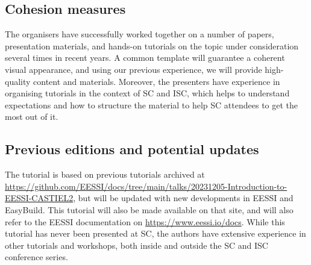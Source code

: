 \subsection*{Cohesion measures}
The organisers have successfully worked together on a number of papers, presentation materials,
and hands-on tutorials on the topic under consideration several times in recent years.
A common template
will guarantee
a coherent visual appearance, and using our previous experience, we will provide high-quality content and materials.
Moreover, the presenters have experience in organising tutorials in the context of SC and ISC, which helps to understand
expectations
and how to structure the material
to help SC attendees to get the most out of it.

\subsection*{Previous editions and potential updates}
The tutorial is based on previous tutorials archived at
\url{https://github.com/EESSI/docs/tree/main/talks/20231205-Introduction-to-EESSI-CASTIEL2},
but will be updated with new developments in EESSI and EasyBuild.
This tutorial will also be made available on that site, and will also refer to the EESSI documentation on
\url{https://www.eessi.io/docs}.
While this tutorial has never been presented at SC, the authors have extensive
experience in other tutorials and workshops, both inside and outside the SC and ISC conference series.